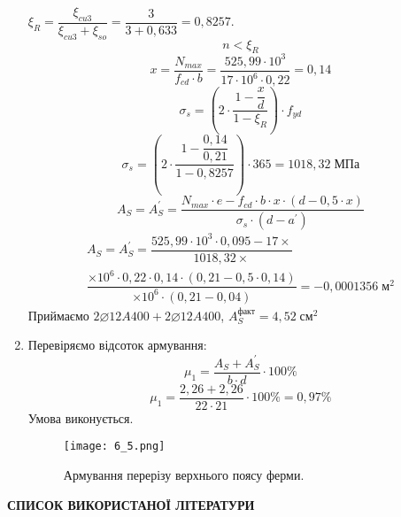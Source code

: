 \documentclass[a4paper,14pt]{article}
\begin{document}
\begin{enumerate}
        $\xi_R = \dfrac{\xi_{cu3}}{\xi_{cu3} + \xi_{so}} = \dfrac{3}{3 + 0,633} = 0,8257$.
        $$n < \xi_R$$
        \begin{equation}
            x = \dfrac{N_{max}}{f_{cd} \cdot b} = \dfrac{525,99 \cdot 10^3}{17 \cdot 10^6 \cdot 0,22} = 0,14
        \end{equation}
        \begin{equation}
            \sigma_s = \left(2 \cdot \dfrac{1 - \dfrac{x}{d}}{1 - \xi_R}\right) \cdot f_{yd}
        \end{equation}
        $$\sigma_s = \left(2 \cdot \dfrac{1 - \dfrac{0,14}{0,21}}{1 - 0,8257}\right) \cdot 365 = 1018,32\;\textit{МПа}$$
        \begin{equation}
            A_S = A_S^\prime = \dfrac{N_{max} \cdot e - f_{cd} \cdot b \cdot x \cdot (d - 0,5 \cdot x)}{\sigma_s \cdot (d - a^\prime)}
        \end{equation}
        \begin{multline*}
        A_S = A_S^\prime = \dfrac{525,99 \cdot 10^3 \cdot 0,095 - 17 \times}{1018,32 \times} \\ \dfrac{\times 10^6 \cdot 0,22 \cdot 0,14 \cdot (0,21 - 0,5 \cdot 0,14)}{ \times 10^6 \cdot (0,21 - 0,04)} = -0,0001356\;\textit{м}^2  
    \end{multline*}
        Приймаємо $2\varnothing12A400 + 2\varnothing12A400$, $A_S^{\textit{факт}} = 4,52\;\textit{см}^2$
    \item Перевіряємо відсоток армування:
        \begin{equation}
            \mu_1 = \dfrac{A_S + A_S^\prime}{b \cdot d} \cdot 100\%
        \end{equation}
        $$\mu_1 = \dfrac{2,26 + 2,26}{22 \cdot 21} \cdot 100\% = 0,97\%$$
        Умова виконується.
        \begin{figure}[h!]
            \begin{center}
                   \texttt{[image: 6\_5.png]}
                   \caption{Армування перерізу верхнього поясу ферми.}\label{ris6_5} 
           \end{center}
        \end{figure}
\end{enumerate}
\newpage
\begin{center}
    \textbf{СПИСОК ВИКОРИСТАНОЇ ЛІТЕРАТУРИ}
\end{center}
\end{document}
